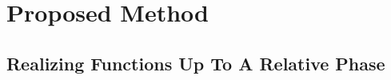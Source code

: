\documentclass[paper]{ieice}
\providecommand{\DIFadd}[1]{{\protect\color{blue}{#1}}} %
\providecommand{\DIFaddbegin}{} %
\providecommand{\DIFaddend}{} %
\newcommand{\DIFaddincludegraphics}[2][]{{\color{blue}\fbox{\DIFOincludegraphics[#1]{#2}}}} %
\DeclareRobustCommand{\DIFaddbegin}{\DIFOaddbegin \let\includegraphics\DIFaddincludegraphics} %
\DeclareRobustCommand{\DIFaddend}{\DIFOaddend \let\includegraphics\DIFOincludegraphics} %
\begin{document}

\section{Proposed Method}
\label{Sec:proposed}
\subsection{Realizing  \DIFaddbegin \DIFadd{Arbitrary Boolean }\DIFaddend Functions Up To A Relative Phase}
 \DIFaddbegin \label{Subsec:FNOT}
\DIFaddend 

\end{document}
